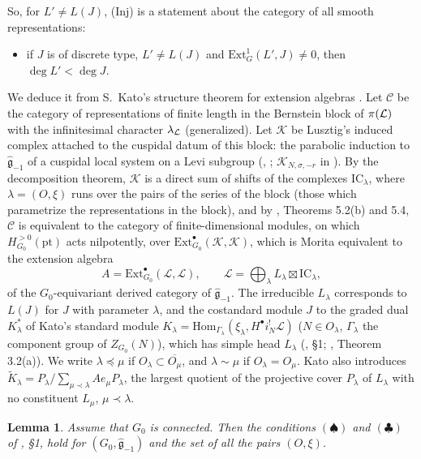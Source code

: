 \documentclass[a4paper,12pt,leqno]{amsart}
\theoremstyle{plain}
\newtheorem{lemma}[thm]{Lemma}
\theoremstyle{definition}
\begin{document}
\noindent So, for $L'\neq L(J)$, (Inj) is a statement about the category of all smooth
representations:
\begin{itemize}
\item[(Inj$_G$)] if $J$ is of discrete type, $L'\neq L(J)$ and $\mathrm{Ext}^1_G(L',J)\neq0$, then
$\deg L'<\deg J$.
\end{itemize}
We deduce it from S.~Kato's structure theorem for extension algebras \cite{Kat17}. Let
$\mathcal{C}$ be the category of representations of finite length in the Bernstein block of $\pi(\mathcal{L})$
with the infinitesimal character $\lambda_{\mathcal{L}}$ (generalized). Let $\mathcal K$ be Lusztig's induced
complex attached to the cuspidal datum of this block: the parabolic induction to
$\widehat{\mathfrak g}_{-1}$ of a cuspidal local system on a Levi subgroup (\cite{Lus95}, \cite{Lus02};
$\mathcal K_{N,\sigma,-r}$ in \cite{Sol25}). By the decomposition theorem, $\mathcal K$ is a direct sum of
shifts of the complexes $\mathrm{IC}_\lambda$, where $\lambda=(O,\xi)$ runs over the pairs of the series
of the block (those which parametrize the representations in the block), and by \cite{Sol25}, Theorems
5.2(b) and 5.4, $\mathcal{C}$ is equivalent to the category of finite-dimensional modules, on which
$H^{>0}_{G_0}(\mathrm{pt})$ acts nilpotently, over $\mathrm{Ext}^\bullet_{G_0}(\mathcal K,\mathcal K)$,
which is Morita equivalent to the extension algebra
\[A=\mathrm{Ext}^\bullet_{G_0}(\mathcal{L},\mathcal{L}),\qquad \mathcal{L}=\bigoplus_\lambda
L_\lambda\boxtimes\mathrm{IC}_\lambda,\]
of the $G_0$-equivariant derived category of $\widehat{\mathfrak g}_{-1}$. The irreducible $L_\lambda$
corresponds to $L(J)$ for $J$ with parameter $\lambda$, and the costandard module $J$ to the graded dual
$K_\lambda^*$ of Kato's standard module $K_\lambda=\mathrm{Hom}_{\Gamma_\lambda}(\xi_\lambda,H^\bullet
i_N^!\mathcal L)$ ($N\in O_\lambda$, $\Gamma_\lambda$ the component group of $Z_{G_0}(N)$), which has simple
head $L_\lambda$ (\cite{Kat17}, \S1; \cite{Sol25}, Theorem 3.2(a)). We write $\lambda\preceq\mu$ if
$O_\lambda\subset\overline{O_\mu}$, and $\lambda\sim\mu$ if $O_\lambda=O_\mu$.
Kato also introduces $\widetilde K_\lambda=P_\lambda/\sum_{\mu\prec\lambda}Ae_\mu P_\lambda$, the
largest quotient of the projective cover $P_\lambda$ of $L_\lambda$ with no constituent $L_\mu$,
$\mu\prec\lambda$.

\begin{lemma}\label{lem:K} Assume that $G_0$ is connected. Then the conditions $(\spadesuit)$ and
$(\clubsuit)$ of \cite{Kat17}, \S1, hold for $(G_0,\widehat{\mathfrak g}_{-1})$ and the set of all the pairs $(O,\xi)$.
\end{lemma}
\end{document}
